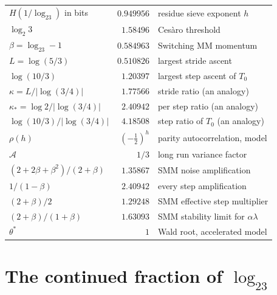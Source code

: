 \begin{table}[ht]
\begin{tabular}{@{}lrl@{}}
$H(1/\log_23)$ in bits & $0.949956$ & residue sieve exponent $h$ \\
$\log_2 3$ & $1.58496$ & Ces\`aro threshold \\
$\beta=\log_23-1$ & $0.584963$ & Switching MM momentum \\
$L=\log(5/3)$ & $0.510826$ & largest stride ascent \\
$\log(10/3)$ & $1.20397$ & largest step ascent of $T_0$ \\
$\kappa=L/|\log(3/4)|$ & $1.77566$ & stride ratio (an analogy) \\
$\kappa_*=\log2/|\log(3/4)|$ & $2.40942$ & per step ratio (an analogy) \\
$\log(10/3)/|\log(3/4)|$ & $4.18508$ & step ratio of $T_0$ (an analogy) \\
$\rho(h)$ & $(-\tfrac12)^h$ & parity autocorrelation, model \\
$\mathcal A$ & $1/3$ & long run variance factor \\
$(2+2\beta+\beta^2)/(2+\beta)$ & $1.35867$ & SMM noise amplification \\
$1/(1-\beta)$ & $2.40942$ & every step amplification \\
$(2+\beta)/2$ & $1.29248$ & SMM effective step multiplier \\
$(2+\beta)/(1+\beta)$ & $1.63093$ & SMM stability limit for $\alpha\lambda$ \\
$\theta^*$ & $1$ & Wald root, accelerated model \\
\bottomrule
\end{tabular}
\end{table}

\section*{The continued fraction of $\log_23$}

